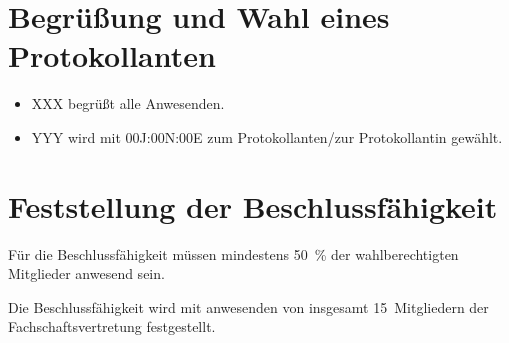 \documentclass[sitzung=fsv]{fsphys-protokoll}
\begin{document}
\section{Begrüßung und Wahl eines Protokollanten}
\begin{itemize}
	\item XXX begrüßt alle Anwesenden.
	\item YYY wird mit 00J:00N:00E zum Protokollanten/zur Protokollantin gewählt.
\end{itemize}

\section{Feststellung der Beschlussfähigkeit}
Für die Beschlussfähigkeit müssen mindestens \SI{50}{\percent} der wahlberechtigten Mitglieder anwesend sein.

Die Beschlussfähigkeit wird mit {\protokollanzahlanwesend} anwesenden von insgesamt 15~Mitgliedern der Fachschaftsvertretung festgestellt.

\end{document}
